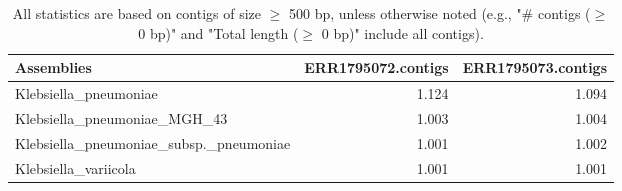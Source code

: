 \documentclass[12pt,a4paper]{article}
\begin{document}
\begin{table}[ht]
\begin{center}
\caption{All statistics are based on contigs of size $\geq$ 500 bp, unless otherwise noted (e.g., "\# contigs ($\geq$ 0 bp)" and "Total length ($\geq$ 0 bp)" include all contigs).}
\begin{tabular}{|l*{2}{|r}|}
\hline
Assemblies & ERR1795072.contigs & ERR1795073.contigs \\ \hline
Klebsiella\_pneumoniae & 1.124 & 1.094 \\ \hline
Klebsiella\_pneumoniae\_MGH\_43 & 1.003 & 1.004 \\ \hline
Klebsiella\_pneumoniae\_subsp.\_pneumoniae & 1.001 & 1.002 \\ \hline
Klebsiella\_variicola & 1.001 & 1.001 \\ \hline
\end{tabular}
\end{center}
\end{table}
\end{document}
